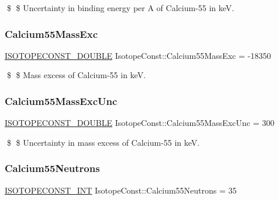 \$ \$ Uncertainty in binding energy per A of Calcium-\/55 in keV. \mbox{\label{group___isotope_const-_calcium-_ca55_ga9189d8dce03f23dcf125ab6313c675ca}} 
\subsubsection{\texorpdfstring{Calcium55\+Mass\+Exc}{Calcium55MassExc}}
{\footnotesize\ttfamily \mbox{\hyperlink{group___isotope_const-_macros_ga8f45a7272ce02c0b4c65c44636ed719a}{I\+S\+O\+T\+O\+P\+E\+C\+O\+N\+S\+T\+\_\+\+D\+O\+U\+B\+LE}} Isotope\+Const\+::\+Calcium55\+Mass\+Exc = -\/18350}

\$ \$ Mass excess of Calcium-\/55 in keV. \mbox{\label{group___isotope_const-_calcium-_ca55_ga00c3b402ab6be6e1a7e6b6cfd55e3218}} 
\subsubsection{\texorpdfstring{Calcium55\+Mass\+Exc\+Unc}{Calcium55MassExcUnc}}
{\footnotesize\ttfamily \mbox{\hyperlink{group___isotope_const-_macros_ga8f45a7272ce02c0b4c65c44636ed719a}{I\+S\+O\+T\+O\+P\+E\+C\+O\+N\+S\+T\+\_\+\+D\+O\+U\+B\+LE}} Isotope\+Const\+::\+Calcium55\+Mass\+Exc\+Unc = 300}

\$ \$ Uncertainty in mass excess of Calcium-\/55 in keV. \mbox{\label{group___isotope_const-_calcium-_ca55_ga8b79490a883d8cbecca84e9ad3bafda0}} 
\subsubsection{\texorpdfstring{Calcium55\+Neutrons}{Calcium55Neutrons}}
{\footnotesize\ttfamily \mbox{\hyperlink{group___isotope_const-_macros_ga5f18360b3e99483a35c32d789e62621c}{I\+S\+O\+T\+O\+P\+E\+C\+O\+N\+S\+T\+\_\+\+I\+NT}} Isotope\+Const\+::\+Calcium55\+Neutrons = 35}

